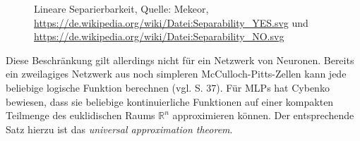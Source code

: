 \documentclass[
	12pt,
	a4paper,
	BCOR10mm,
	DIV14,
	listof=totoc,
	bibliography=totoc,
	headsepline
]{scrreprt}
\begin{document}
\begin{figure}
	\centering
	\hfill
	\caption{Lineare Separierbarkeit, Quelle: Mekeor, \url{https://de.wikipedia.org/wiki/Datei:Separability_YES.svg} und \url{https://de.wikipedia.org/wiki/Datei:Separability_NO.svg}}
	\label{fig:separierbarkeit}
\end{figure} 

Diese Beschränkung gilt allerdings nicht für ein Netzwerk von Neuronen. Bereits ein zweilagiges Netzwerk aus noch simpleren McCulloch-Pitts-Zellen kann jede beliebige logische Funktion berechnen (vgl. \cite{Rojas:1996:NNS:235222} S. 37).
Für MLPs hat Cybenko \cite{cybenko:mcss} bewiesen, dass sie beliebige kontinuierliche Funktionen auf einer kompakten Teilmenge des euklidischen Raums $\mathbb{R}^n$ approximieren können. Der entsprechende Satz hierzu ist das \textit{universal approximation theorem}.

\bigskip
\end{document}
